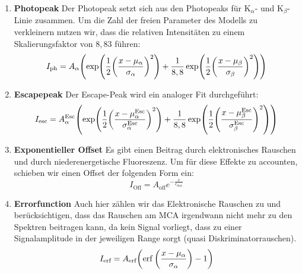 			\begin{enumerate}
				\item \textbf{Photopeak} Der Photopeak setzt sich aus den Photopeaks für $\text{K}_{\alpha}$- und $\text{K}_{\beta}$-Linie zusammen. Um die Zahl der freien Parameter des Modells zu verkleinern nutzen wir, dass die relativen Intensitäten zu einem Skalierungsfaktor von $8,83$ führen:
				\begin{equation*}
					{ I_{\text{ph}}= A_{{\alpha}} \qty(\exp(\frac{1}{2}\qty(\frac{x-\mu_{{\alpha}}}{\sigma_{\alpha}})^{2})+ \frac{1}{8,8}\exp(\frac{1}{2}\qty(\frac{x-\mu_{{\beta}}}{\sigma_{{\beta}}})^{2}))}
				\end{equation*}
				
				\item \textbf{Escapepeak} Der Escape-Peak wird ein analoger Fit durchgeführt:
				\begin{equation*}
					{    I_{\text{esc}}= A_{{\alpha}}^{\text{Esc}} \qty(\exp(\frac{1}{2}\qty(\frac{x-\mu_{{\alpha}}^{\text{Esc}}}{\sigma_{\alpha}^{\text{Esc}}})^{2})+ \frac{1}{8,8}\exp(\frac{1}{2}\qty(\frac{x-\mu_{{\beta}}^{\text{Esc}}}{\sigma_{{\beta}}^{\text{Esc}}})^{2}))}
				\end{equation*}
				
				\item \textbf{Exponentieller Offset} Es gibt einen Beitrag durch elektronisches Rauschen und durch niederenergetische Fluoreszenz.  Um für diese Effekte zu accounten, schieben wir einen Offset der folgenden Form ein:
				\begin{equation*}
					I_{\text{Off}}= A_{\text{off}} e^{-\frac{x}{c_{\text{char}}}}
				\end{equation*}
				
				\item \textbf{Errorfunction} Auch hier zählen wir das Elektronische Rauschen zu und berücksichtigen, dass das Rauschen am MCA irgendwann nicht mehr zu den Spektren beitragen kann, da kein Signal vorliegt, dass zu einer Signalamplitude in der jeweiligen Range sorgt (quasi Diskriminatorrauschen).
				\begin{equation*}
					I_{\text{erf}}= A_{\text{erf}} \qty(\erf\qty(\frac{x-\mu_{\alpha}}{\sigma_{\alpha}})-1)
				\end{equation*}
			\end{enumerate}
			
			
			
